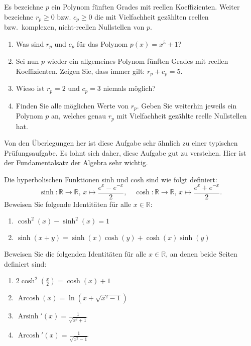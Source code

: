\documentclass[12pt]{article}
\DeclareMathOperator{\arccosh}{Arcosh}
\DeclareMathOperator{\arcsinh}{Arsinh}
\newcommand{\R}{\mathbb{R}} %
\newenvironment{problem}[2][\textcolor{blue}{Tipps \& Tricks zu}]{\begin{trivlist}
        \item[\hskip \labelsep {\bfseries #1}\hskip \labelsep {\bfseries \textcolor{blue}{#2}.}]}{\end{trivlist}}
\newenvironment{question}[2][\textcolor{red}{Aufgabe}]{\begin{trivlist}
        \item[\hskip \labelsep {\bfseries \textcolor{red}{#1}}\hskip \labelsep {\bfseries \textcolor{red}{#2}.}]}{\end{trivlist}}
\begin{document}
\begin{question}{2}
        Es bezeichne $p$ ein Polynom fünften Grades mit reellen Koeffizienten. Weiter bezeichne $r_p\geq 0$ bzw. $c_p\geq 0$ die mit Vielfachheit gezählten reellen bzw.\ komplexen, nicht-reellen Nullstellen von $p$.
        \begin{enumerate}[label=(\alph*)]
                \item Was sind $r_p$ und $c_p$ für das Polynom $p(x)=x^5+1$?
                \item Sei nun $p$ wieder ein allgemeines Polynom fünften Grades mit reellen
                      Koeffizienten. Zeigen Sie, dass immer gilt: $r_p+c_p=5$.
                \item Wieso ist $r_p=2$ und $c_p=3$ niemals möglich?
                \item Finden Sie alle möglichen Werte von $r_p$. Geben Sie weiterhin jeweils ein
                      Polynom $p$ an, welches genau $r_p$ mit Vielfachheit gezählte reelle
                      Nullstellen hat.
        \end{enumerate}
\end{question}

\begin{problem}{2} Von den Überlegungen her ist diese Aufgabe sehr ähnlich zu einer typischen Prüfungsaufgabe. Es lohnt sich daher, diese Aufgabe gut zu verstehen. Hier ist der Fundamentalsatz der Algebra sehr wichtig.        
\end{problem}

\begin{question}{3}
        Die hyperbolischen Funktionen sinh und cosh sind wie folgt definiert:
        \begin{equation}
                \sinh: \R\to\R,\,x\mapsto\frac{e^x-e^{-x}}{2},\quad\cosh: \R\to\R,\,x\mapsto\frac{e^x+e^{-x}}{2}.
        \end{equation}
        Beweisen Sie folgende Identitäten für alle $x\in\R$:
        \begin{enumerate}[label=(\alph*)]
                \item $\cosh^2(x)-\sinh^2(x)=1$
                \item $\sinh(x+y)=\sinh(x)\cosh(y)+\cosh(x)\sinh(y)$
        \end{enumerate}
        Beweisen Sie die folgenden Identitäten für alle $x\in\R$, an denen beide Seiten definiert sind:
        \begin{enumerate}[label=(\alph*)]
                \item $2\cosh^2\left(\frac{x}{2}\right)=\cosh(x)+1$
                \item $\arccosh(x)=\ln\left(x+\sqrt{x^2-1}\right)$
                \item $\arcsinh'(x)=\frac{1}{\sqrt{x^2+1}}$
                \item $\arccosh'(x)=\frac{1}{\sqrt{x^2-1}}$
        \end{enumerate}
\end{question}
\end{document}
